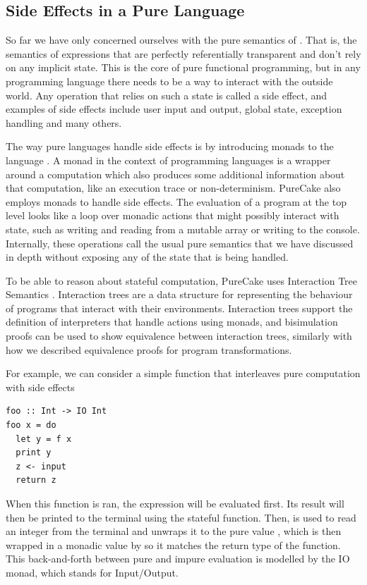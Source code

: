 \subsection {Side Effects in a Pure Language}

So far we have only concerned ourselves with the pure semantics of \ThunkLang{}.
That is, the semantics of expressions that are perfectly
referentially transparent and don't rely on any implicit state. This is the core
of pure functional programming, but in any programming language there needs to
be a way to interact with the outside world. Any operation that relies on such a
state is called a side effect, and examples of side effects include user input
and output, global state, exception handling and many others.

The way pure languages handle side effects is by introducing monads to the
language \cite{benton2000monads}. A monad in the context of programming
languages is a wrapper around a computation which also produces some additional
information about that computation, like an execution trace or non-determinism.
PureCake also employs monads to handle side effects. The evaluation of a
\ThunkLang{} program at the top level looks like a loop over monadic actions
that might possibly interact with state, such as writing and reading from a
mutable array or writing to the console. Internally, these operations call the
usual pure semantics that we have discussed in depth without exposing any of the
state that is being handled.

To be able to reason about stateful computation, PureCake uses Interaction Tree
Semantics \cite{xia2019interaction}. Interaction trees are a data structure for
representing the behaviour of programs that interact with their environments.
Interaction trees support the definition of interpreters that handle actions
using monads, and bisimulation proofs can be used to show equivalence between
interaction trees, similarly with how we described equivalence proofs for
program transformations.

For example, we can consider a simple function that interleaves pure computation
with side effects
\begin{verbatim}
foo :: Int -> IO Int
foo x = do
  let y = f x
  print y
  z <- input
  return z
\end{verbatim}
When this function is ran, the  expression will be evaluated first. Its
result will then be printed to the terminal using the stateful 
function. Then,  is used to read an integer from the terminal and
unwraps it to the pure value , which is then wrapped in a monadic value
by  so it matches the return type of the function. This
back-and-forth between pure and impure evaluation is modelled by the IO monad,
which stands for Input/Output.

